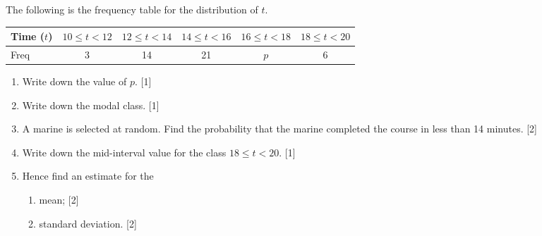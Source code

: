 \documentclass[12pt, twoside]{article}
\begin{document}
\begin{enumerate}
    The following is the frequency table for the distribution of $t$. \\[0.25cm]
        \begin{tabular}{|l|c|c|c|c|c|}
        \hline
        Time ($t$) & $10 \leq t < 12$ & $12 \leq t < 14$ & $14 \leq t < 16$ & $16 \leq t < 18$ & $18 \leq t < 20$ \\ 
        \hline 
        Freq & 3 & 14 & 21 & $p$ & 6  \\ 
        \hline 
        \end{tabular}
        \begin{enumerate}
        \item Write down the value of $p$. \hfill [1]
        \item Write down the modal class. \hfill [1]
        \item A marine is selected at random. Find the probability that the marine completed the course in less than 14 minutes. \hfill [2]
        \item Write down the mid-interval value for the class $18 \leq t < 20$. \hfill [1]
        \item Hence find an estimate for the
        \begin{enumerate}
            \item mean; \hfill [2]
            \item standard deviation. \hfill [2] 
        \end{enumerate}
        \end{enumerate}
                    
\end{enumerate}
\end{document}
